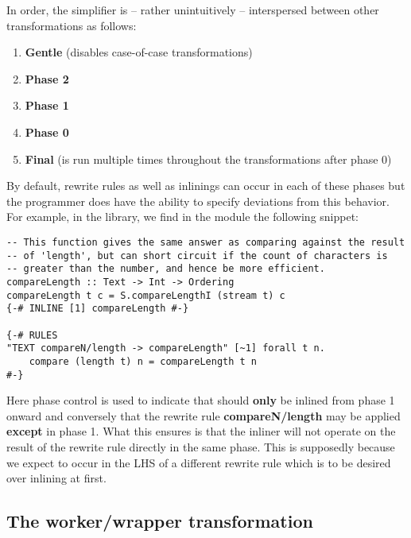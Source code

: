 In order, the simplifier is -- rather unintuitively -- interspersed between other transformations as follows:

\begin{enumerate}
  \item \textbf{Gentle} (disables case-of-case transformations)
  \item \textbf{Phase 2}
  \item \textbf{Phase 1}
  \item \textbf{Phase 0}
  \item \textbf{Final} (is run multiple times throughout the transformations after phase 0)
\end{enumerate}

By default, rewrite rules as well as inlinings can occur in each of these phases but the programmer does have the ability
to specify deviations from this behavior. For example, in the  library, we find in the  module
the following snippet:

\begin{listing}[H]
\begin{verbatim}
-- This function gives the same answer as comparing against the result
-- of 'length', but can short circuit if the count of characters is
-- greater than the number, and hence be more efficient.
compareLength :: Text -> Int -> Ordering
compareLength t c = S.compareLengthI (stream t) c
{-# INLINE [1] compareLength #-}

{-# RULES
"TEXT compareN/length -> compareLength" [~1] forall t n.
    compare (length t) n = compareLength t n
#-}
\end{verbatim}
\end{listing}

Here phase control is used to indicate that  should \textbf{only} be inlined from phase 1 onward and conversely
that the rewrite rule \textbf{compareN/length} may be applied \textbf{except} in phase 1. What this ensures is that the inliner
will not operate on the result of the rewrite rule directly in the same phase. This is supposedly because we expect 
to occur in the LHS of a different rewrite rule which is to be desired over inlining at first.

\subsection{The worker/wrapper transformation}
\label{section:background:worker_wrapper}

